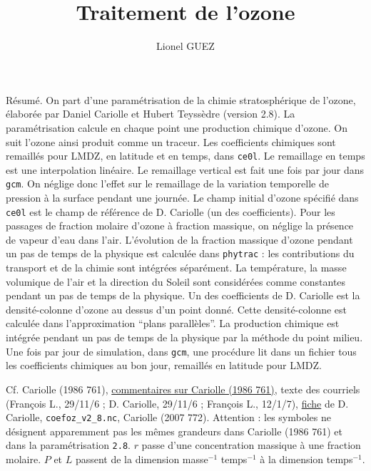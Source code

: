 \documentclass[a4paper,english,french]{article}
\author{Lionel GUEZ}
\title{Traitement de l'ozone}
\begin{document}
\maketitle
\tableofcontents
\listoffigures
\newpage

Résumé. On part d'une paramétrisation de la chimie stratosphérique de
l'ozone, élaborée par Daniel Cariolle et Hubert Teyssèdre (version
2.8). La paramétrisation calcule en chaque point une production
chimique d'ozone. On suit l'ozone ainsi produit comme un traceur. Les
coefficients chimiques sont remaillés pour LMDZ, en latitude et en
temps, dans \verb+ce0l+. Le remaillage en temps est une interpolation
linéaire. Le remaillage vertical est fait une fois par jour dans
\verb+gcm+. On néglige donc l'effet sur le remaillage de la variation
temporelle de pression à la surface pendant une journée.  Le champ
initial d'ozone spécifié dans \verb+ce0l+ est le champ de référence de
D. Cariolle (un des coefficients). Pour les passages de fraction
molaire d'ozone à fraction massique, on néglige la présence de vapeur
d'eau dans l'air.  L'évolution de la fraction massique d'ozone pendant
un pas de temps de la physique est calculée dans \verb+phytrac+ : les
contributions du transport et de la chimie sont intégrées
séparément. La température, la masse volumique de l'air et la
direction du Soleil sont considérées comme constantes pendant un pas
de temps de la physique. Un des coefficients de D. Cariolle est la
densité-colonne d'ozone au dessus d'un point donné. Cette
densité-colonne est calculée dans l'approximation ``plans
parallèles''. La production chimique est intégrée pendant un pas de
temps de la physique par la méthode du point milieu. Une fois par jour
de simulation, dans \verb+gcm+, une procédure lit dans un fichier tous
les coefficients chimiques au bon jour, remaillés en latitude pour
LMDZ.

Cf. Cariolle (1986 761),
\href{file:/user/guez/Documents/Commentaires_lectures/Autres_publications/-1991/Cariolle_1986_761.texfol/Cariolle_1986_761.dvi}{commentaires
  sur Cariolle (1986 761)}, texte des courriels (François L., 29/11/6
; D. Cariolle, 29/11/6 ; François L., 12/1/7),
\href{file:///user/guez/Documents/Informatique_fonctionnement/O3_Cariolle.txt}{fiche}
de D. Cariolle, \verb+coefoz_v2_8.nc+, Cariolle (2007 772).  Attention
: les symboles ne désignent apparemment pas les mêmes grandeurs dans
Cariolle (1986 761) et dans la paramétrisation \verb+2.8+.  $r$ passe
d'une concentration massique à une fraction molaire.  $P$ et $L$
passent de la dimension masse$^{-1}$ temps$^{-1}$ à la dimension
temps$^{-1}$.
\end{document}
